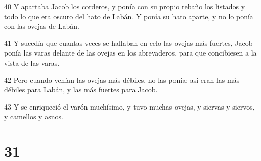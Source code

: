 \par 40 Y apartaba Jacob los corderos, y ponía con su propio rebaño los listados y todo lo que era oscuro del hato de Labán. Y ponía su hato aparte, y no lo ponía con las ovejas de Labán.
\par 41 Y sucedía que cuantas veces se hallaban en celo las ovejas más fuertes, Jacob ponía las varas delante de las ovejas en los abrevaderos, para que concibiesen a la vista de las varas.
\par 42 Pero cuando venían las ovejas más débiles, no las ponía; así eran las más débiles para Labán, y las más fuertes para Jacob.
\par 43 Y se enriqueció el varón muchísimo, y tuvo muchas ovejas, y siervas y siervos, y camellos y asnos.

\chapter{31}

